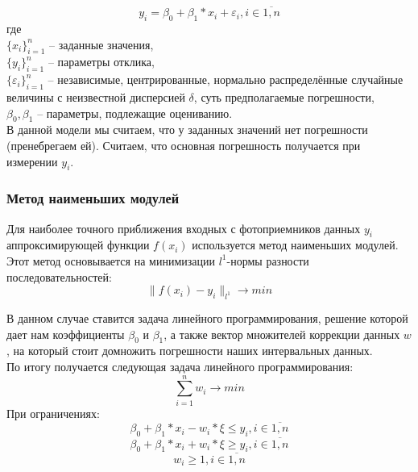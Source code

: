 \begin{equation}
	y_i = \beta_0 + \beta_1*x_i + \varepsilon_i, i \in \overline{1,n}
\end{equation}
где \\
$\{x_i\}_{i=1}^n$ -- заданные значения, \\
$\{y_i\}_{i=1}^n$ -- параметры отклика, \\
$\{\varepsilon_i\}_{i=1}^n$ -- независимые, центрированные, нормально распределённые случайные величины с неизвестной дисперсией $\delta$, суть предполагаемые погрешности, \\
$\beta_0, \beta_1$ -- параметры, подлежащие оцениванию. \\

В данной модели мы считаем, что у заданных значений нет погрешности (пренебрегаем ей). Считаем, что основная погрешность получается при измерении $y_i$.


\subsubsection{Метод наименьших модулей}
Для наиболее точного приближения входных с фотоприемников данных $y_i$ аппроксимирующей функции  $f(x_i)$ используется метод наименьших модулей. Этот метод основывается на минимизации $l^1$-нормы разности последовательностей:
\begin{equation}
	\| f(x_i) - y_i\|_{l^1} \rightarrow min
\end{equation}

В данном случае ставится задача линейного программирования, решение которой дает нам коэффициенты $\beta_0$ и $\beta_1$, а также вектор множителей коррекции данных $w$, на который стоит домножить погрешности наших интервальных данных. \\
По итогу получается следующая задача линейного программирования:
\begin{equation}
	\sum_{i=1}^n w_i \rightarrow min
\end{equation} \label{eq:mnm}
При ограничениях:
\begin{equation}
	\beta_0 + \beta_1*x_i - w_i * \xi \leq y_i, i \in \overline{1,n}
\end{equation}
\begin{equation}
	\beta_0 + \beta_1*x_i + w_i * \xi \geq y_i, i \in \overline{1,n}
\end{equation}
\begin{equation}
	w_i \geq 1, i \in \overline{1,n}
\end{equation}



